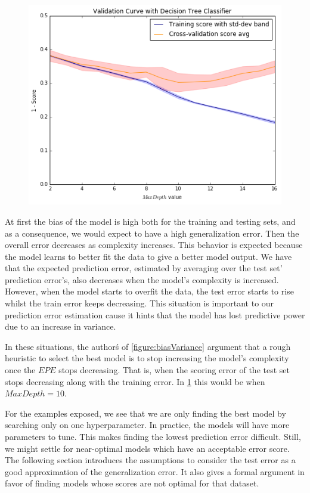 \begin{figure}[h!]
\begin{center}
\includegraphics[width=0.7\columnwidth]{figures/figure-biasVariance/dtree_overfit_problem_2.png}
\caption{
}
\label{figure:dtree_overfit_problem_2}
\end{center}
\end{figure}


At first the bias of the model is high both for the training and testing sets, and as a consequence, we would expect to have a high generalization error. Then the overall error decreases as complexity increases. This behavior is expected because the model learns to better fit the data to give a better model output. We have that the expected prediction error, estimated by averaging over the test set' prediction error's, also decreases when the model's complexity is increased. However, when the model starts to overfit the data, the test error starts to rise whilst the train error keeps decreasing. This situation is important to our prediction error estimation cause it hints that the model has lost predictive power due to an increase in variance.

In these situations, the author\'s of \cref{figure:biasVariance} argument that a rough heuristic to select the best model is to stop increasing the model's complexity once the $EPE$ stops decreasing. That is, when the scoring error of the test set stops decreasing along with the training error. In \cref{figure:dtree_overfit_problem_2} this would be when $Max Depth = 10$.

For the examples exposed, we see that we are only finding the best model by searching only on one hyperparameter. In practice, the models will have more parameters to tune. This makes finding the lowest prediction error difficult.
Still, we might settle for near-optimal models which have an acceptable error score. The following section introduces the assumptions to consider the test error as a good approximation of the generalization error. It also gives a formal argument in favor of finding models whose scores are not optimal for that dataset.


